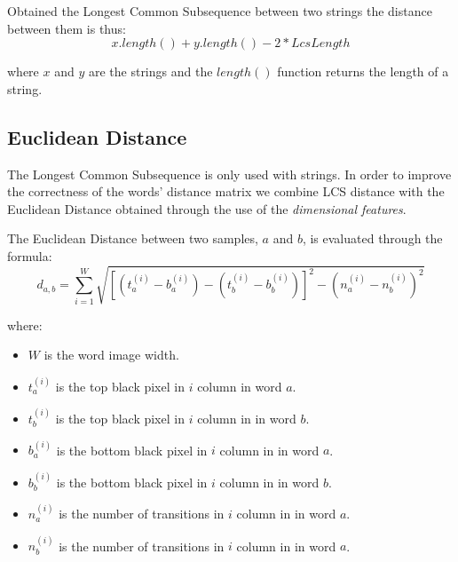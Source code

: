 Obtained the Longest Common Subsequence between two strings the distance between them is thus:
$$ x.length() + y.length() - 2*LcsLength$$

where $x$ and $y$ are the strings and the $length()$ function returns the length of a string.

\subsection{Euclidean Distance} 

The Longest Common Subsequence is only used with strings. In order to improve the correctness of the words' distance matrix we combine LCS distance with the Euclidean Distance obtained through the use of the \textit{dimensional features}.

The Euclidean Distance between two samples, $a$ and $b$, is evaluated through the formula:
$$d_{a,b} = \sum_{i = 1}^{W} \sqrt{[(t_{a}^{(i)} - b_{a}^{(i)}) - (t_{b}^{(i)} - b_{b}^{(i)})]^2 - (n_{a}^{(i)} - n_{b}^{(i)})^2}$$

where:
\begin{itemize}
\item $W$ is the word image width.
\item $t_{a}^{(i)}$ is the top black pixel in $i$ column in word $a$.
\item $t_{b}^{(i)}$ is the top black pixel in $i$ column in in word $b$.
\item $b_{a}^{(i)}$ is the bottom black pixel in $i$ column in in word $a$.
\item $b_{b}^{(i)}$ is the bottom black pixel in $i$ column in in word $b$.
\item $n_{a}^{(i)}$ is the number of transitions in $i$ column in in word $a$.
\item $n_{b}^{(i)}$ is the number of transitions in $i$ column in in word $a$.
\end{itemize}
